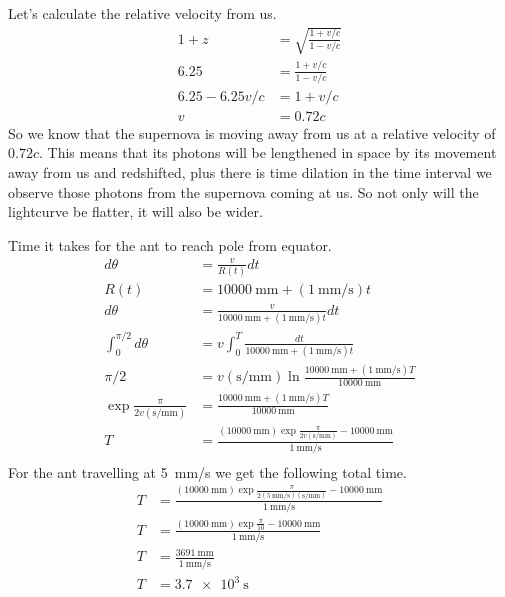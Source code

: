 \documentclass{homework}
\begin{document}
\question
Let's calculate the relative velocity from us.
\begin{align*}
    1 + z	&=	\sqrt{\frac{1 + v/c}{1 - v/c}} \\
    6.25	&=	\frac{1 + v/c}{1 - v/c} \\
    6.25 - 6.25 v/c    &=	1 + v/c	\\
    v   &=  0.72c
\end{align*}
So we know that the supernova is moving away from us at a relative velocity of $0.72c$. This means that its photons will be lengthened in space by its movement away from us and redshifted, plus there is time dilation in the time interval we observe those photons from the supernova coming at us. So not only will the lightcurve be flatter, it will also be wider.


\question
Time it takes for the ant to reach pole from equator.
\begin{align*}
    d\theta    &=	\frac{v}{R(t)} dt	\\
    R(t)    &=	\SI{10000}{\milli\metre} + (\SI{1}{\milli\metre/\second})t	\\
    d\theta    &=	\frac{v}{\SI{10000}{\milli\metre} + (\SI{1}{\milli\metre/\second})t} dt	\\
    \int_0^{\pi/2} d\theta  &=  v \int_0^T \frac{dt}{\SI{10000}{\milli\metre} + (\SI{1}{\milli\metre/\second})t}    \\
    \pi/2   &=  v(\si{\second/\milli\metre}) \ln \frac{\SI{10000}{\milli\metre} + (\SI{1}{\milli\metre/\second})T}{\SI{10000}{\milli\metre}}  \\
    \exp{\frac{\pi}{2v(\si{\second/\milli\metre})}}    &=  \frac{\SI{10000}{\milli\metre} + (\SI{1}{\milli\metre/\second})T}{\SI{10000}{\milli\metre}}  \\
    T    &=	\boxed{\frac{(\SI{10000}{\milli\metre}) \exp{\frac{\pi}{2v(\si{\second/\milli\metre})}} - \SI{10000}{\milli\metre}}{\SI{1}{\milli\metre/\second}}}	\\
\end{align*}
For the ant travelling at \SI{5}{\milli\metre/\second} we get the following total time.
\begin{align*}
    T    &=	\frac{(\SI{10000}{\milli\metre}) \exp{\frac{\pi}{2(\SI{5}{\milli\metre/\second})(\si{\second/\milli\metre})}} - \SI{10000}{\milli\metre}}{\SI{1}{\milli\metre/\second}}	\\
    T    &=	\frac{(\SI{10000}{\milli\metre}) \exp{\frac{\pi}{10}} - \SI{10000}{\milli\metre}}{\SI{1}{\milli\metre/\second}}	\\
    T    &=	\frac{\SI{3691}{\milli\metre}}{\SI{1}{\milli\metre/\second}}	\\
    T   &=  \boxed{\SI{3.7e3}{\second}}
\end{align*}
\end{document}
